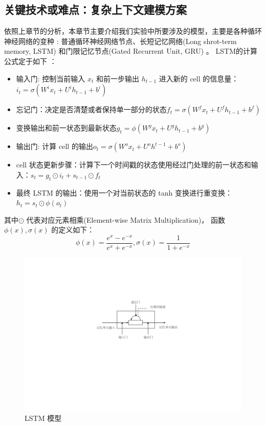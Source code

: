 \documentclass[twoside,UTF8,AutoFakeBold]{buaathesis}
\begin{document}
\subsection{关键技术或难点：复杂上下文建模方案}
依照上章节的分析，本章节主要介绍我们实验中所要涉及的模型，主要是各种循环神经网络的变种 \cite{DBLP:conf/icml/JozefowiczZS15}: 普通循环神经网络节点、长短记忆网络(Long shrot-term memory, LSTM) \cite{DBLP:journals/taslp/SundermeyerNS15} 和门限记忆节点(Gated Recurrent Unit, GRU) \cite{DBLP:conf/nips/ChungKDGCB15}。 LSTM的计算公式定于如下 \cite{DBLP:journals/neco/HochreiterS97}：
\begin{itemize}
\item 输入门: 控制当前输入 $x_t$ 和前一步输出 $h_{t−1}$ 进入新的 cell 的信息量：$i_t=\sigma(W^i x_t+U^i h_{t-1}+b^i)$
\item  忘记门：决定是否清楚或者保持单一部分的状态$f_t=\sigma(W^f x_t+U^f h_{t-1}+b^f)$
\item  变换输出和前一状态到最新状态$g_t=\phi(W^g x_t+U^g h_{t-1}+b^g)$
\item  输出门: 计算 cell 的输出$o_t=\sigma(W^o x_t+U^o h^{t-1}+b^o)$
\item  cell 状态更新步骤：计算下一个时间戳的状态使用经过门处理的前一状态和输入：$s_t=g_t\odot i_t+s_{t-1}\odot f_t$
\item  最终 LSTM 的输出：使用一个对当前状态的 tanh 变换进行重变换：$h_t=s_t\odot \phi(o_t)$
\end{itemize}
其中$\odot$ 代表对应元素相乘(Element-wise Matrix Multiplication)， 函数 $\phi(x), \sigma(x)$ 的定义如下：
\begin{equation}\label{equ:tanh}
  \phi(x)=\frac{e^x-e^{-x}}{e^x+e^{-x}},\sigma(x)=\frac{1}{1+e^{-x}}
\end{equation}

\begin{figure}
  \centering
  \includegraphics[width=0.7\linewidth]{./figures/lstm}
  \caption{LSTM 模型}\label{fig:lstm}
\end{figure}
\end{document}
